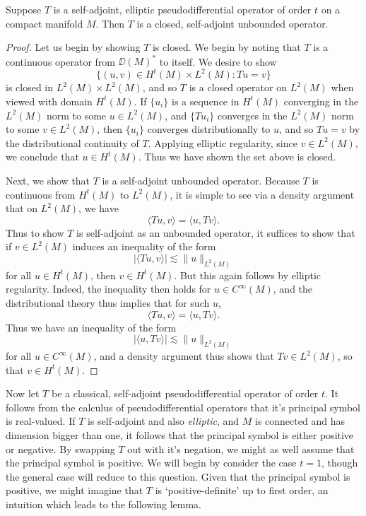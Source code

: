 \begin{theorem}
    Suppose $T$ is a self-adjoint, elliptic pseudodifferential operator of order $t$ on a compact manifold $M$. Then $T$ is a closed, self-adjoint unbounded operator.
\end{theorem}
\begin{proof}
    Let us begin by showing $T$ is closed. We begin by noting that $T$ is a continuous operator from $\DD(M)^*$ to itself. We desire to show
    \[ \{ (u,v) \in H^t(M) \times L^2(M) : Tu = v \} \]
    is closed in $L^2(M) \times L^2(M)$, and so $T$ is a closed operator on $L^2(M)$ when viewed with domain $H^t(M)$. If $\{ u_i \}$ is a sequence in $H^t(M)$ converging in the $L^2(M)$ norm to some $u \in L^2(M)$, and $\{ Tu_i \}$ converges in the $L^2(M)$ norm to some $v \in L^2(M)$, then $\{ u_i \}$ converges distributionally to $u$, and so $Tu = v$ by the distributional continuity of $T$. Applying elliptic regularity, since $v \in L^2(M)$, we conclude that $u \in H^t(M)$. Thus we have shown the set above is closed.

    Next, we show that $T$ is a self-adjoint unbounded operator. Because $T$ is continuous from $H^t(M)$ to $L^2(M)$, it is simple to see via a density argument that on $L^2(M)$, we have
    \[ \langle Tu, v \rangle = \langle u, Tv \rangle. \]
    Thus to show $T$ is self-adjoint as an unbounded operator, it suffices to show that if $v \in L^2(M)$ induces an inequality of the form
    \[ |\langle Tu, v \rangle| \lesssim \| u \|_{L^2(M)} \]
    for all $u \in H^t(M)$, then $v \in H^t(M)$. But this again follows by elliptic regularity. Indeed, the inequality then holds for $u \in C^\infty(M)$, and the distributional theory thus implies that for such $u$,
    \[ \langle Tu, v \rangle = \langle u, Tv \rangle. \]
    Thus we have an inequality of the form
    \[ |\langle u, Tv \rangle| \lesssim \| u \|_{L^2(M)} \]
    for all $u \in C^\infty(M)$, and a density argument thus shows that $Tv \in L^2(M)$, so that $v \in H^t(M)$.
\end{proof}

Now let $T$ be a classical, self-adjoint pseudodifferential operator of order $t$. It follows from the calculus of pseudodifferential operators that it's principal symbol is real-valued. If $T$ is self-adjoint and also \emph{elliptic}, and $M$ is connected and has dimension bigger than one, it follows that the principal symbol is either positive or negative. By swapping $T$ out with it's negation, we might as well assume that the principal symbol is positive. We will begin by consider the case $t = 1$, though the general case will reduce to this question. Given that the principal symbol is positive, we might imagine that $T$ is `positive-definite' up to first order, an intuition which leads to the following lemma.

